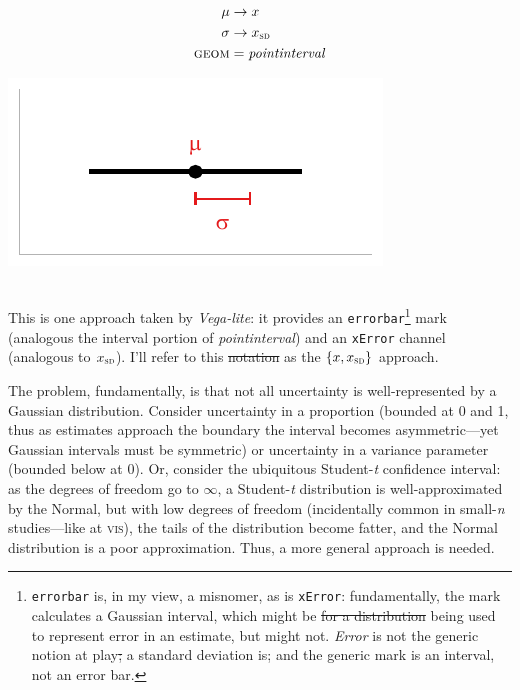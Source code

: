 \documentclass[journal]{vgtc}                     %
\newcommand{\equationfigure}[2]{%
\noindent
\begin{minipage}{.5\columnwidth}
\setlength{\abovedisplayskip}{0pt} %
\setlength{\belowdisplayskip}{0pt} %
#1\end{minipage}%
\begin{minipage}{.4\columnwidth}\centering #2 \end{minipage}%
\vspace{.5\belowdisplayskip}\\
}
\providecommand{\DIFadd}[1]{{\protect\color{blue}\uwave{#1}}} %
\providecommand{\DIFdel}[1]{{\protect\color{red}\sout{#1}}}                      %
\providecommand{\DIFaddbegin}{} %
\providecommand{\DIFaddend}{} %
\providecommand{\DIFdelbegin}{} %
\providecommand{\DIFdelend}{} %
\begin{document}
\equationfigure{
\begin{align*}
\mu &\rightarrow x\\
\sigma &\rightarrow x_\textsc{sd}\\
\textsc{geom} &= \mathit{pointinterval}
\end{align*}
}{\includegraphics[width=1.2\columnwidth]{figs/2-mean_sd_interval.pdf}}
This is one approach taken by \textit{Vega-lite}: it provides an \texttt{errorbar}\footnote{\label{foot:errorbar}\texttt{errorbar} is, in my view, a misnomer, as is \texttt{xError}: fundamentally, the mark calculates a Gaussian interval, which might be \DIFdelbegin \DIFdel{for a distribution }\DIFdelend being used to represent error in an estimate, but might not. \textit{Error} is not the generic notion at play\DIFdelbegin \DIFdel{; }\DIFdelend \DIFaddbegin \DIFadd{, }\DIFaddend a standard deviation is; and the generic mark is an interval, not an error bar.} mark (analogous the interval portion of \textit{pointinterval}) and an \texttt{xError}  channel (analogous to $x_\textsc{sd}$). I'll refer to this \DIFdelbegin \DIFdel{notation }\DIFdelend as the $\{x, x_\textsc{sd}\}$ approach.

The problem, fundamentally, is that not all uncertainty is well-represented by a Gaussian distribution. Consider uncertainty in a proportion (bounded at 0 and 1, thus as estimates approach the boundary the interval becomes asymmetric---yet Gaussian intervals must be symmetric) or uncertainty in a variance parameter (bounded below at 0). Or, consider the ubiquitous Student-\textit{t} confidence interval: as the degrees of freedom go to $\infty$, a Student-\textit{t} distribution is well-approximated by the Normal, but with low degrees of freedom (incidentally common in small-\textit{n} studies---like at \textsc{vis}), the tails of the distribution become fatter, and the Normal distribution is a poor approximation. Thus, a more general approach is needed.
\end{document}
